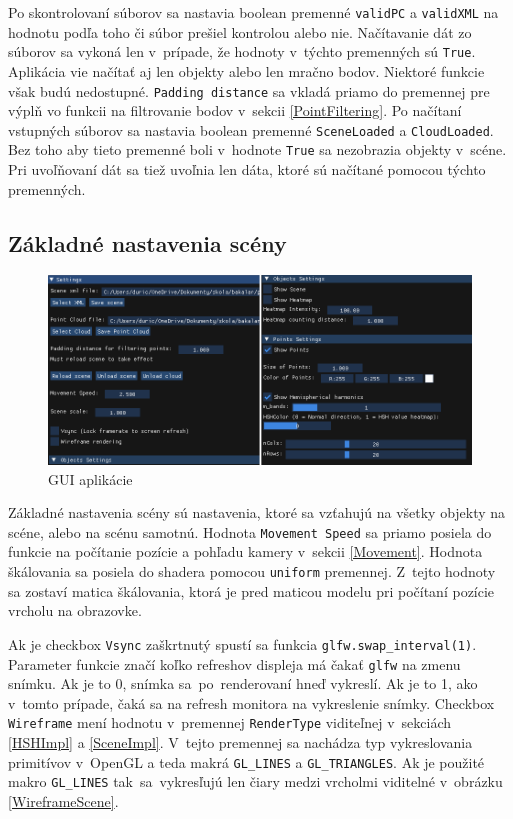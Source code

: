 Po skontrolovaní súborov sa nastavia boolean premenné \verb|validPC| a \verb|validXML| na hodnotu podľa toho či súbor prešiel kontrolou alebo nie. Načítavanie dát zo súborov sa vykoná len v~prípade, že hodnoty v~týchto premenných sú \verb|True|. Aplikácia vie načítať aj len objekty alebo len mračno bodov. Niektoré funkcie však budú nedostupné. \verb|Padding distance| sa vkladá priamo do premennej pre výplň vo funkcii na filtrovanie bodov v~sekcii \ref{PointFiltering}. Po načítaní vstupných súborov sa nastavia boolean premenné \verb|SceneLoaded| a \verb|CloudLoaded|. Bez toho aby tieto premenné boli v~hodnote \verb|True| sa nezobrazia objekty v~scéne. Pri uvoľňovaní dát sa tiež uvoľnia len dáta, ktoré sú načítané pomocou týchto premenných.

\subsection*{Základné nastavenia scény}
\begin{figure}[t!]\label{GUI}
    \centering
    \includegraphics[width=0.95\linewidth]{obrazky-figures/GUI2.png}
    \caption{GUI aplikácie}
\end{figure}

Základné nastavenia scény sú nastavenia, ktoré sa vzťahujú na všetky objekty na scéne, alebo na scénu samotnú. Hodnota \verb|Movement Speed| sa priamo posiela do funkcie na počítanie pozície a pohľadu kamery v~sekcii \ref{Movement}. Hodnota škálovania sa posiela do shadera pomocou \verb|uniform| premennej. Z~tejto hodnoty sa zostaví matica škálovania, ktorá je pred maticou modelu pri počítaní pozície vrcholu na obrazovke. 

Ak je checkbox \verb|Vsync| zaškrtnutý spustí sa funkcia  \verb|glfw.swap_interval(1)|. Parameter funkcie značí koľko refreshov displeja má čakať \verb|glfw| na zmenu snímku. Ak je to 0, snímka sa~po~renderovaní hneď vykreslí. Ak je to 1, ako v~tomto prípade, čaká sa na refresh monitora na vykreslenie snímky. Checkbox \verb|Wireframe| mení hodnotu v~premennej \verb|RenderType| viditeľnej v~sekciách \ref{HSHImpl} a \ref{SceneImpl}. V~tejto premennej sa nachádza typ vykreslovania primitívov v~OpenGL a teda makrá \verb|GL_LINES| a \verb|GL_TRIANGLES|. Ak je použité makro \verb|GL_LINES| tak~sa~vykresľujú len čiary medzi vrcholmi viditelné v~obrázku \ref{WireframeScene}.

